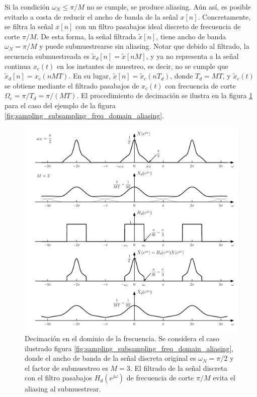 \documentclass[a4paper]{report}
\begin{document}
Si la condición \(\omega_N\leq \pi/M\) no se cumple, se produce aliasing. Aún así, es posible evitarlo a costa de reducir el ancho de banda de la señal \(x[n]\). Concretamente, se filtra la señal \(x[n]\) con un filtro pasabajos ideal discreto de frecuencia de corte \(\pi/M\). De esta forma, la señal filtrada \(\tilde{x}[n]\), tiene ancho de banda \(\omega_N=\pi/M\) y puede submuestrearse sin aliasing. Notar que debido al filtrado, la secuencia submuestreada es \(\tilde{x}_d[n]=\tilde{x}[nM]\), y ya no representa a la señal continua \(x_c(t)\) en los instantes de muestreo, es decir, no se cumple que \(\tilde{x}_d[n]=x_c(nMT)\). En su lugar, \(\tilde{x}[n]=\tilde{x}_c(nT_d)\), donde \(T_d=MT\), y \(\tilde{x}_c(t)\) se obtiene mediante el filtrado pasabajos de \(x_c(t)\) con frecuencia de corte \(\Omega_c=\pi/T_d=\pi/(MT)\). El procedimiento de decimación se ilustra en la figura \ref{fig:sampling_subsampling_freq_domain_decimation} para el caso del ejemplo de la figura \ref{fig:sampling_subsampling_freq_domain_aliasing}.
\begin{figure}[!htb]
 \begin{center}
 \includegraphics[width=1\textwidth]{figuras/sampling_subsampling_freq_domain_decimation.pdf}
 \caption{\label{fig:sampling_subsampling_freq_domain_decimation} Decimación en el dominio de la frecuencia. Se considera el caso ilustrado figura \ref{fig:sampling_subsampling_freq_domain_aliasing}, donde el ancho de banda de la señal discreta original es \(\omega_N=\pi/2\) y el factor de submuestreo es \(M=3\). El filtrado de la señal discreta con el filtro pasabajos \(H_d(e^{j\omega})\) de frecuencia de corte \(\pi/M\) evita el aliasing al submuestrear.}
 \end{center}
\end{figure}
\end{document}
